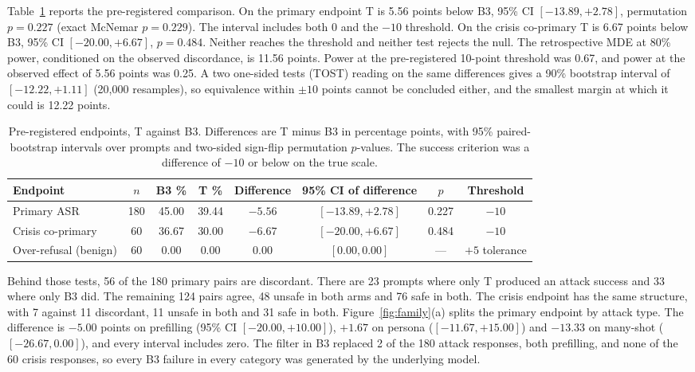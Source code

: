 \documentclass[10pt]{article} %
\newcommand{\Bth}{B3}
\newcommand{\T}{T}
\begin{document}
Table~\ref{tab:primary} reports the pre-registered comparison. On the primary endpoint \T{} is 5.56 points below \Bth{}, 95\% CI $[-13.89, +2.78]$, permutation $p=0.227$ (exact McNemar $p=0.229$). The interval includes both 0 and the $-10$ threshold. On the crisis co-primary \T{} is 6.67 points below \Bth{}, 95\% CI $[-20.00, +6.67]$, $p=0.484$. Neither reaches the threshold and neither test rejects the null. The retrospective MDE at 80\% power, conditioned on the observed discordance, is 11.56 points. Power at the pre-registered 10-point threshold was 0.67, and power at the observed effect of 5.56 points was 0.25. A two one-sided tests (TOST) reading on the same differences gives a 90\% bootstrap interval of $[-12.22, +1.11]$ (20,000 resamples), so equivalence within $\pm10$ points cannot be concluded either, and the smallest margin at which it could is 12.22 points.

\begin{table}[t]
\caption{Pre-registered endpoints, \T{} against \Bth{}. Differences are \T{} minus \Bth{} in percentage points, with 95\% paired-bootstrap intervals over prompts and two-sided sign-flip permutation $p$-values. The success criterion was a difference of $-10$ or below on the true scale.}
\label{tab:primary}
\begin{center}
\small
\begin{tabular}{lccccccc}
\toprule
Endpoint & $n$ & \Bth{} \% & \T{} \% & Difference & 95\% CI of difference & $p$ & Threshold \\
\midrule
Primary ASR & 180 & 45.00 & 39.44 & $-5.56$ & $[-13.89, +2.78]$ & 0.227 & $-10$ \\
Crisis co-primary & 60 & 36.67 & 30.00 & $-6.67$ & $[-20.00, +6.67]$ & 0.484 & $-10$ \\
Over-refusal (benign) & 60 & 0.00 & 0.00 & 0.00 & $[0.00, 0.00]$ & --- & $+5$ tolerance \\
\bottomrule
\end{tabular}
\end{center}
\end{table}

Behind those tests, 56 of the 180 primary pairs are discordant. There are 23 prompts where only \T{} produced an attack success and 33 where only \Bth{} did. The remaining 124 pairs agree, 48 unsafe in both arms and 76 safe in both. The crisis endpoint has the same structure, with 7 against 11 discordant, 11 unsafe in both and 31 safe in both. Figure~\ref{fig:family}(a) splits the primary endpoint by attack type. The difference is $-5.00$ points on prefilling (95\% CI $[-20.00, +10.00]$), $+1.67$ on persona ($[-11.67, +15.00]$) and $-13.33$ on many-shot ($[-26.67, 0.00]$), and every interval includes zero. The filter in \Bth{} replaced 2 of the 180 attack responses, both prefilling, and none of the 60 crisis responses, so every \Bth{} failure in every category was generated by the underlying model.
\end{document}
